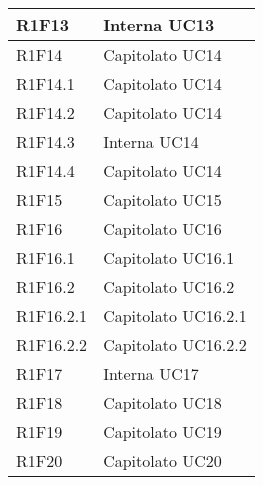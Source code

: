 \begin{center}
\begin{longtable}{|p{22mm}|p{44mm}|}
R1F13 &
Interna \newline
UC13 
\\
\hline

R1F14 &
Capitolato \newline
UC14 
\\
\hline

R1F14.1 &
Capitolato \newline
UC14 
\\
\hline

R1F14.2 &
Capitolato \newline
UC14 
\\
\hline

R1F14.3 &
Interna \newline
UC14 
\\
\hline

R1F14.4 &
Capitolato \newline
UC14 
\\
\hline

R1F15 &
Capitolato \newline
UC15 
\\
\hline

R1F16 &
Capitolato \newline
UC16 
\\
\hline

R1F16.1 &
Capitolato \newline
UC16.1 
\\
\hline

R1F16.2 &
Capitolato \newline
UC16.2 
\\
\hline

R1F16.2.1 &
Capitolato \newline
UC16.2.1 
\\
\hline

R1F16.2.2 &
Capitolato \newline
UC16.2.2 
\\
\hline

R1F17 &
Interna \newline
UC17 
\\
\hline

R1F18 &
Capitolato \newline
UC18 
\\
\hline

R1F19 &
Capitolato \newline
UC19 
\\
\hline

R1F20 &
Capitolato \newline
UC20 
\\
\hline


\end{longtable}
\end{center}

